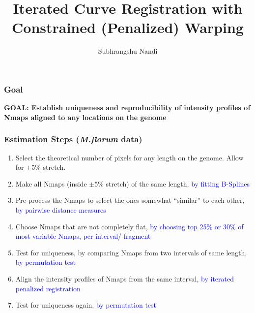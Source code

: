 \documentclass[10pt,dvipsnames,table]{beamer}
\title[Uniqueness and Reproducibility of Nmaps]{Iterated Curve Registration with Constrained (Penalized) Warping}
\author{Subhrangshu Nandi}
\begin{document}
\setlength{\baselineskip}{16truept}
\frame{\maketitle}



\begin{frame}
\frametitle{Goal}
{\bf{GOAL: Establish uniqueness and reproducibility of intensity profiles of Nmaps aligned to any locations on the genome}}
\end{frame}

\begin{frame}
\frametitle{Estimation Steps ({\emph{M.florum}} data)}
\begin{enumerate}
\item Select the theoretical number of pixels for any length on the genome. Allow for $\pm 5\%$ stretch. 
\item Make all Nmaps (inside $\pm 5\%$ stretch) of the same length, {\textcolor{blue}{by fitting B-Splines}}
\item Pre-process the Nmaps to select the ones somewhat ``similar'' to each other, {\textcolor{blue}{by pairwise distance measures}}
\item Choose Nmaps that are not completely flat, {\textcolor{blue}{by choosing top 25\% or 30\% of most variable Nmaps, per interval/ fragment}}
\item Test for uniqueness, by comparing Nmaps from two intervals of same length, {\textcolor{blue}{by permutation test}}
\item Align the intensity profiles of Nmaps from the same interval, {\textcolor{blue}{by iterated penalized registration}}
\item Test for uniqueness again, {\textcolor{blue}{by permutation test}}
\end{enumerate}
\end{frame}
\end{document}
